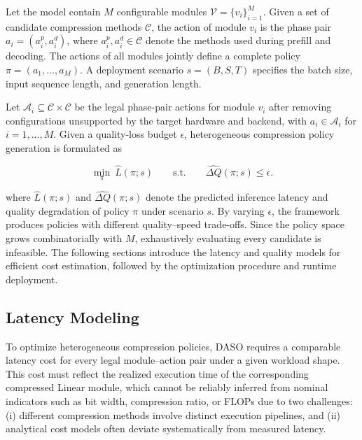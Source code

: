 \documentclass[letterpaper]{article} %
\begin{document}
Let the model contain $M$ configurable modules $\mathcal{V}=\{v_i\}_{i=1}^{M}$. Given a set of candidate compression methods $\mathcal{C}$, the action of module $v_i$ is the phase pair $a_i=(a_i^{p},a_i^{d})$, where $a_i^{p},a_i^{d}\in\mathcal{C}$ denote the methods used during prefill and decoding. The actions of all modules jointly define a complete policy $\pi=(a_1,\ldots,a_M)$. A deployment scenario $s=(B,S,T)$ specifies the batch size, input sequence length, and generation length.

Let $\mathcal{A}_i\subseteq\mathcal{C}\times\mathcal{C}$ be the legal phase-pair actions for module $v_i$ after removing configurations unsupported by the target hardware and backend, with $a_i\in\mathcal{A}_i$ for $i=1,\ldots,M$. Given a quality-loss budget $\epsilon$, heterogeneous compression policy generation is formulated as

\begin{equation}
\min_{\pi}\ \widehat{L}(\pi;s)
\qquad \mathrm{s.t.}\qquad
\widehat{\Delta Q}(\pi;s)\leq \epsilon.
\label{eq:problem}
\end{equation}

where $\widehat{L}(\pi;s)$ and $\widehat{\Delta Q}(\pi;s)$ denote the predicted inference latency and quality degradation of policy $\pi$ under scenario $s$. By varying $\epsilon$, the framework produces policies with different quality--speed trade-offs. Since the policy space grows combinatorially with $M$, exhaustively evaluating every candidate is infeasible. The following sections introduce the latency and quality models for efficient cost estimation, followed by the optimization procedure and runtime deployment.



\subsection{Latency Modeling}
To optimize heterogeneous compression policies, DASO requires a comparable latency cost for every legal module--action pair under a given workload shape. This cost must reflect the realized execution time of the corresponding compressed Linear module, which cannot be reliably inferred from nominal indicators such as bit width, compression ratio, or FLOPs due to two challenges: (i) different compression methods involve distinct execution pipelines, and (ii) analytical cost models often deviate systematically from measured latency.
\end{document}
